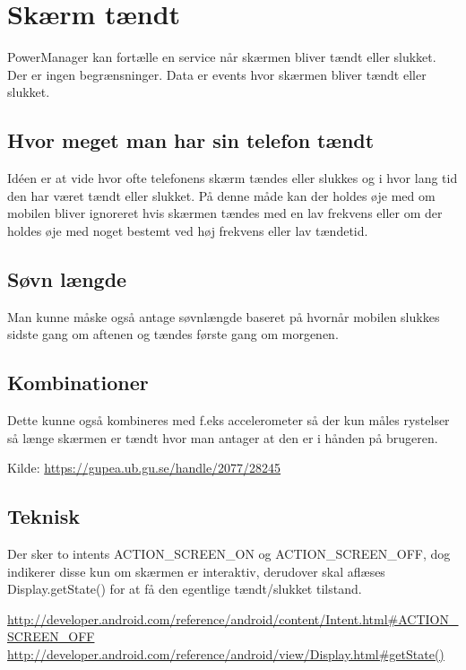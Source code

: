 \section{Skærm tændt}
PowerManager kan fortælle en service når skærmen bliver tændt eller slukket. Der er ingen begrænsninger. Data er events hvor skærmen bliver tændt eller slukket.

\subsection{Hvor meget man har sin telefon tændt}
Idéen er at vide hvor ofte telefonens skærm tændes eller slukkes og i hvor lang tid den har været tændt eller slukket. På denne måde kan der holdes øje med om mobilen bliver ignoreret hvis skærmen tændes med en lav frekvens eller om der holdes øje med noget bestemt ved høj frekvens eller lav tændetid. 

\subsection{Søvn længde}
Man kunne måske også antage søvnlængde baseret på hvornår mobilen slukkes sidste gang om aftenen og tændes første gang om morgenen. 

\subsection{Kombinationer}
Dette kunne også kombineres med f.eks accelerometer så der kun måles rystelser så længe skærmen er tændt hvor man antager at den er i hånden på brugeren.

Kilde: \url{https://gupea.ub.gu.se/handle/2077/28245}

\subsection{Teknisk}
Der sker to intents ACTION\_SCREEN\_ON og ACTION\_SCREEN\_OFF, dog indikerer disse kun om skærmen er interaktiv, derudover skal aflæses Display.getState() for at få den egentlige tændt/slukket tilstand.

\url{http://developer.android.com/reference/android/content/Intent.html#ACTION_SCREEN_OFF}\\
\url{http://developer.android.com/reference/android/view/Display.html#getState()}
